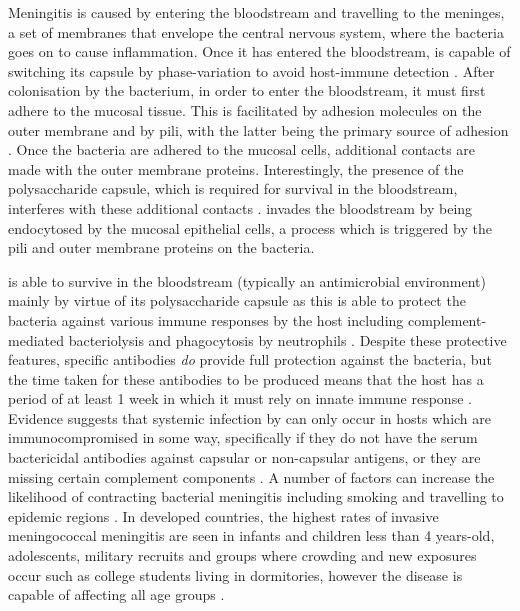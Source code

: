 Meningitis is caused by \Nm\space entering the bloodstream and travelling to the meninges, a set of membranes that envelope the central nervous system, where the bacteria goes on to cause inflammation. Once it has entered the bloodstream, \Nm\space is capable of switching its capsule by phase-variation to avoid host-immune detection \cite{AmandaJBeddek05182009,Moxon199424}. After colonisation by the bacterium, in order to enter the bloodstream, it must first adhere to the mucosal tissue. This is facilitated by adhesion molecules on the outer membrane and by pili, with the latter being the primary source of adhesion \cite{MarcelvanDeuren01012000,Carbonnelle2009B78}. Once the bacteria are adhered to the mucosal cells, additional contacts are made with the outer membrane proteins. Interestingly, the presence of the polysaccharide capsule, which is required for survival in the bloodstream, interferes with these additional contacts \cite{Stephens2009B71}. \Nm\space invades the bloodstream by being endocytosed by the mucosal epithelial cells, a process which is triggered by the pili and outer membrane proteins on the bacteria.

\Nm\space is able to survive in the bloodstream (typically an antimicrobial environment) mainly by virtue of its polysaccharide capsule as this is able to protect the bacteria against various immune responses by the host including complement-mediated bacteriolysis and phagocytosis by neutrophils \cite{MarcelvanDeuren01012000}.
Despite these protective features, specific antibodies \textit{do} provide full protection against the bacteria, but the time taken for these antibodies to be produced means that the host has a period of at least 1 week in which it must rely on innate immune response \cite{MarcelvanDeuren01012000}. Evidence suggests that systemic infection by \Nm\space can only occur in hosts which are immunocompromised in some way, specifically if they do not have the serum bactericidal antibodies against capsular or non-capsular antigens, or they are missing certain complement components \cite{IWDeVoe06011982}. A number of factors can increase the likelihood of contracting bacterial meningitis including smoking and travelling to epidemic regions \cite{Stephens2009B71}. In developed countries, the highest rates of invasive meningococcal meningitis are seen in infants and children less than 4 years-old, adolescents, military recruits and groups where crowding and new exposures occur such as college students living in dormitories, however the disease is capable of affecting all age groups \cite{Stephens2009B71}.

